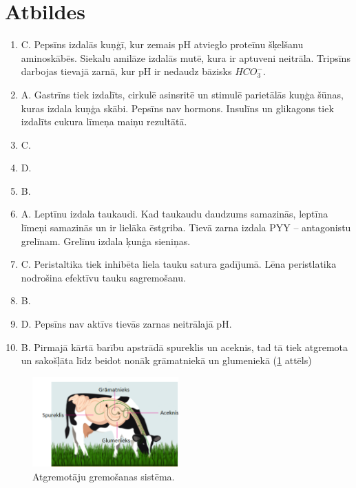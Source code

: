 \documentclass[12pt,a4paper]{article}
\newcommand{\figref}[1]{\ref{#1} attēls}
\begin{document}
\newpage
\section*{Atbildes}

\begin{enumerate}
\item C. Pepsīns izdalās kuņģī, kur zemais pH atvieglo proteīnu šķelšanu aminoskābēs. Siekalu amilāze izdalās mutē, kura ir aptuveni neitrāla. Tripsīns darbojas tievajā zarnā, kur pH ir nedaudz bāzisks $HCO_3^{-}$.
\item A. Gastrīns tiek izdalīts, cirkulē asinsritē un stimulē parietālās kuņģa šūnas, kuras izdala kuņģa skābi. Pepsīns nav hormons. Insulīns un glikagons tiek izdalīts cukura līmeņa maiņu rezultātā.
\item C.
\item D.
\item B. 
\item A. Leptīnu izdala taukaudi. Kad taukaudu daudzums samazinās, leptīna līmeņi samazinās un ir lielāka ēstgriba. Tievā zarna izdala PYY – antagonistu grelīnam. Grelīnu izdala ķunģa sieniņas.
\item C. Peristaltika tiek inhibēta liela tauku satura gadījumā. Lēna peristlatika nodrošina efektīvu tauku sagremošanu.
\item B.
\item D. Pepsīns nav aktīvs tievās zarnas neitrālajā pH.
\item B. Pirmajā kārtā barību apstrādā spureklis un aceknis, tad tā tiek atgremota un sakošļāta līdz beidot nonāk grāmatniekā un glumeniekā (\figref{fig:atgremotajs})
\end{enumerate}

\begin{figure}[H]
    \centering
    \includegraphics[width=0.5\textwidth]{atteli/atgremotajs.png}
    \caption{Atgremotāju gremošanas sistēma.}
    \label{fig:atgremotajs}
\end{figure}
\end{document}
